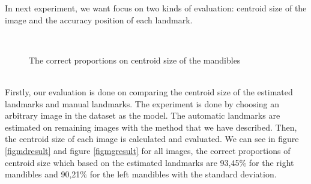 \documentclass[twoside,twocolumn,10pt]{article}
\begin{document}
In next experiment, we want focus on two kinds of evaluation: centroid size of the image and the accuracy position of each landmark.\\
\begin{figure}[h]
\centering
{}~~
\caption{The correct proportions on centroid size of the mandibles}
\label{figctresult}
\end{figure}~\\
Firstly, our evaluation is done on comparing the centroid size of the estimated landmarks and manual landmarks. The experiment is done by choosing an arbitrary 
image in the dataset as the model. The automatic landmarks are estimated on remaining images with the method that we have described. Then, the centroid size of each image is calculated and evaluated. We can see in figure
\ref{figmdresult} and figure \ref{figmgresult} for all images, the
correct proportions of centroid size which based on the estimated landmarks are 93,45\% for the right mandibles and 90,21\% for the left mandibles with the standard deviation\cite{bland1996statistics}.\\
\end{document}
